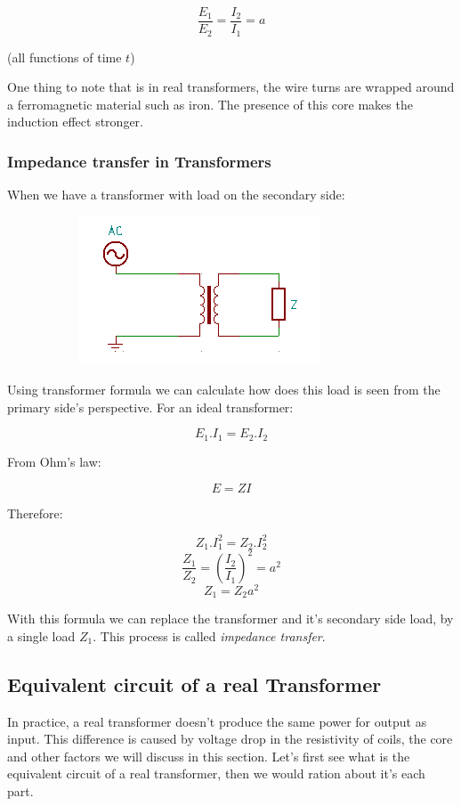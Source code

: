 \documentclass{article}
\begin{document}
	$$ \frac{E_1}{E_2} = \frac{I_2}{I_1} = a $$
	
	(all functions of time $t$)	
	
	One thing to note that is in real transformers, the wire turns are wrapped around a ferromagnetic material such as iron.
	The presence of this core makes the induction effect stronger.
	
	\subsubsection{Impedance transfer in Transformers}
	When we have a transformer with load on the secondary side:
		
	\begin{figure}[h!]
	\centering
	\begin{subfigure}[b]{0.45\linewidth}
		\includegraphics[width=\linewidth]{with_impedance.png}
	\end{subfigure}
	\end{figure}
	
	Using transformer formula we can calculate how does this load is seen from the primary side's perspective.
	For an ideal transformer:

	$$ E_1.I_1 = E_2.I_2$$
	
	From Ohm's law:
	
	$$E = ZI$$
	
	Therefore:
	
	$$ Z_1.I_1^2 = Z_2.I_2^2$$
	$$ \frac{Z_1}{Z_2} = (\frac{I_2}{I_1})^2 = a^2$$	
	$$ Z_1 = Z_2a^2$$
	
	With this formula we can replace the transformer and it's secondary side load, by a single load $Z_1$. This process is called \textit{impedance transfer}.
	
	\subsection{Equivalent circuit of a real Transformer}
	In practice, a real transformer doesn't produce the same power for output as input.
	This difference is caused by voltage drop in the resistivity of coils, the core and other factors we will discuss in this section.
	Let's first see what is the equivalent circuit of a real transformer, then we would ration about it's each part.
	
\end{document}
